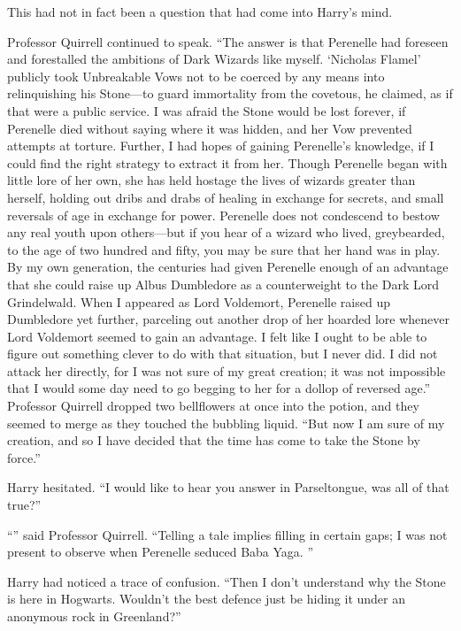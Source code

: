 This had not in fact been a question that had come into Harry’s mind.

Professor Quirrell continued to speak. “The answer is that Perenelle had
foreseen and forestalled the ambitions of Dark Wizards like myself. ‘Nicholas
Flamel’ publicly took Unbreakable Vows not to be coerced by any means into
relinquishing his Stone—to guard immortality from the covetous, he claimed,
as if that were a public service. I was afraid the Stone would be lost forever,
if Perenelle died without saying where it was hidden, and her Vow prevented
attempts at torture. Further, I had hopes of gaining Perenelle’s knowledge, if
I could find the right strategy to extract it from her. Though Perenelle began
with little lore of her own, she has held hostage the lives of wizards greater
than herself, holding out dribs and drabs of healing in exchange for secrets,
and small reversals of age in exchange for power. Perenelle does not condescend
to bestow any real youth upon others—but if you hear of a wizard who lived,
greybearded, to the age of two hundred and fifty, you may be sure that her hand
was in play. By my own generation, the centuries had given Perenelle enough of
an advantage that she could raise up Albus Dumbledore as a counterweight to the
Dark Lord Grindelwald. When I appeared as Lord Voldemort, Perenelle raised up
Dumbledore yet further, parceling out another drop of her hoarded lore whenever
Lord Voldemort seemed to gain an advantage. I felt like I ought to be able to
figure out something clever to do with that situation, but I never did. I did
not attack her directly, for I was not sure of my great creation; it was not
impossible that I would some day need to go begging to her for a dollop of
reversed age.” Professor Quirrell dropped two bellflowers at once into the
potion, and they seemed to merge as they touched the bubbling liquid. “But now
I am sure of my creation, and so I have decided that the time has come to take
the Stone by force.”

Harry hesitated. “I would like to hear you answer in Parseltongue, was all of
that true?”

“” said Professor Quirrell.
“Telling a tale implies filling in certain gaps; I was not present to observe
when Perenelle seduced Baba Yaga. ”

Harry had noticed a trace of confusion. “Then I don’t understand why the
Stone is here in Hogwarts. Wouldn’t the best defence just be hiding it under an
anonymous rock in Greenland?”


